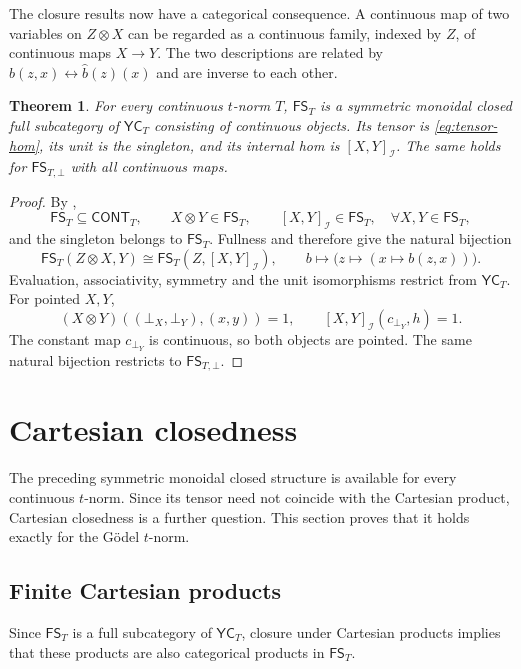 \documentclass[preprint,3p,times]{elsarticle}
\newtheorem{theorem}{Theorem}[section]
\theoremstyle{definition}
\theoremstyle{remark}
\newcommand{\I}{\mathcal{I}}
\newcommand{\FS}{\mathsf{FS}}
\newcommand{\CONT}{\mathsf{CONT}}
\newcommand{\YC}{\mathsf{YC}}
\numberwithin{equation}{section}
\begin{document}
The closure results now have a categorical consequence. A continuous map of two variables on \(Z\otimes X\) can be regarded as a continuous family, indexed by \(Z\), of continuous maps \(X\to Y\). The two descriptions are related by \(b(z,x)\leftrightarrow\widehat b(z)(x)\) and are inverse to each other.

\begin{theorem}\label{thm:smc-tnorm}
For every continuous \(t\)-norm \(T\), \(\FS_T\) is a symmetric monoidal closed full subcategory of \(\YC_T\) consisting of continuous objects. Its tensor is \eqref{eq:tensor-hom}, its unit is the singleton, and its internal hom is \([X,Y]_{\I}\). The same holds for \(\FS_{T,\bot}\) with all continuous maps.
\end{theorem}
\begin{proof}
By ,
\[
 \FS_T\subseteq\CONT_T,
 \qquad X\otimes Y\in\FS_T,
 \qquad [X,Y]_{\I}\in\FS_T,
 \quad \forall X,Y\in\FS_T,
\]
and the singleton belongs to \(\FS_T\). Fullness and
 therefore give the natural bijection
\[
 \FS_T(Z\otimes X,Y)\cong\FS_T(Z,[X,Y]_{\I}),
 \qquad b\longmapsto\bigl(z\mapsto(x\mapsto b(z,x))\bigr).
\]
Evaluation, associativity, symmetry and the unit isomorphisms restrict
from \(\YC_T\).
For pointed \(X,Y\),
\[
 (X\otimes Y)((\bot_X,\bot_Y),(x,y))=1,
 \qquad [X,Y]_{\I}(c_{\bot_Y},h)=1.
\]
The constant map \(c_{\bot_Y}\) is continuous, so both objects are pointed.
The same natural bijection restricts to \(\FS_{T,\bot}\).
\end{proof}



\section{Cartesian closedness}\label{sec:cartesian}
The preceding symmetric monoidal closed structure is available for every continuous \(t\)-norm. Since its tensor need not coincide with the Cartesian product, Cartesian closedness is a further question. This section proves that it holds exactly for the G\"odel \(t\)-norm.

\subsection{Finite Cartesian products}

Since \(\FS_T\) is a full subcategory of \(\YC_T\), closure under Cartesian products implies that these products are also categorical products in \(\FS_T\).
\end{document}
